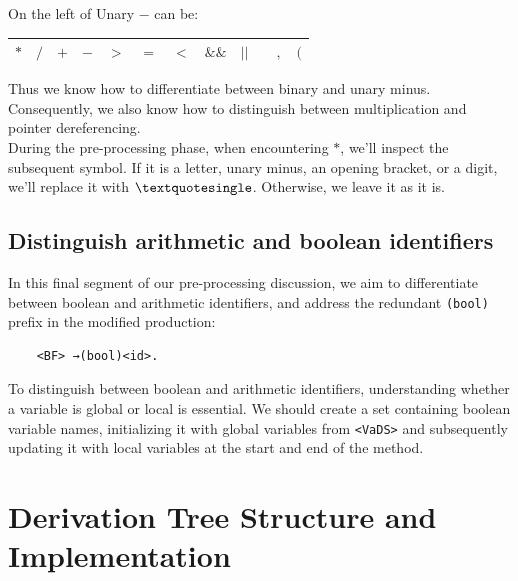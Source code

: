 On the left of Unary \(-\) can be:
\begin{center}
    \begin{tabular}{|c|c|c|c|c|c|c|c|c|c|c|c|}
        \hline
        \( \ast \) & \( / \) & \( + \) & \( - \) & \( > \) & \( = \) & \( < \) & \( \&\& \) & \( || \) & \( \) & \( , \) & \( ( \)\\
        \hline
    \end{tabular}
\end{center}

Thus we know how to differentiate between binary and unary minus. Consequently, we also know how to distinguish between multiplication and pointer dereferencing.\\

During the pre-processing phase, when encountering \(\ast\), we'll inspect the subsequent symbol. If it is a letter, unary minus, an opening bracket, or a digit, we'll replace it with \(\textquotesingle\). Otherwise, we leave it as it is.

\vspace{30pt}

\subsection{Distinguish arithmetic and boolean identifiers}

In this final segment of our pre-processing discussion, we aim to differentiate between boolean and arithmetic identifiers, and address the redundant \texttt{(bool)} prefix in the modified production:

\begin{verbatim}
    <BF> →(bool)<id>.
\end{verbatim}

To distinguish between boolean and arithmetic identifiers, understanding whether a variable is global or local is essential. We should create a set containing boolean variable names, initializing it with global variables from \texttt{<VaDS>} and subsequently updating it with local variables at the start and end of the method.

\newpage


\section{Derivation Tree Structure and Implementation}\label{sec:Derivation Tree Structure and Implementation}

